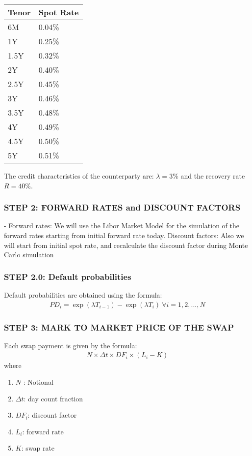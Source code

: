 \documentclass[11pt]{article}
\numberwithin{equation}{subsection}
\begin{document}
\vskip 0.2cm 		
{
	\begin{center}
	\begin{tabular}{|l|l|}
		\hline
		Tenor & Spot Rate \\		
		\hline
		6M	  &  0.04\%  \\
		\hline
		1Y	  &  0.25\%  \\  
		\hline
		1.5Y  &  0.32\%  \\
		\hline
		2Y	  &  0.40\%  \\
		\hline
		2.5Y  &  0.45\%  \\
		\hline
		3Y	  &  0.46\%  \\
		\hline
		3.5Y  &  0.48\%  \\
		\hline
		4Y	  &  0.49\%  \\
		\hline
		4.5Y  &  0.50\%  \\
		\hline


		5Y	  &  0.51\%  \\
		\hline
	\end{tabular}
	\end{center}
}
\vskip 0.4cm


\noindent The credit characteristics of the counterparty are:
\(\lambda=3\%\) and the recovery rate \(R=40\%\). 
\subsubsection{STEP 2: FORWARD RATES and DISCOUNT FACTORS}
- Forward rates:  We will use the Libor Market Model for the simulation of the forward rates starting from initial forward rate today.
\noindent Discount factors: Also we will start from initial spot rate, and recalculate the discount factor during Monte Carlo simulation
\subsubsection{STEP 2.0: Default probabilities}
\noindent Default probabilities are obtained using the formula:
\begin{eqnarray*}
	PD_{i}= \exp(\lambda T_{i-1})-\exp(\lambda T_{i}) \ \forall i =1,2,...,N
\end{eqnarray*}

\subsubsection{STEP 3: MARK TO MARKET PRICE OF THE SWAP}
Each swap payment is given by the formula:
\begin{eqnarray*}
	N \times \Delta t \times DF_i \times (L_i - K) 
\end{eqnarray*}
where 
\begin{enumerate}
\item \(N\) : Notional
\item \(\Delta t\): day count fraction
\item \(DF_i\): discount factor
\item \(L_i\): forward rate
\item \(K\): swap rate 
\end{enumerate}
\end{document}

